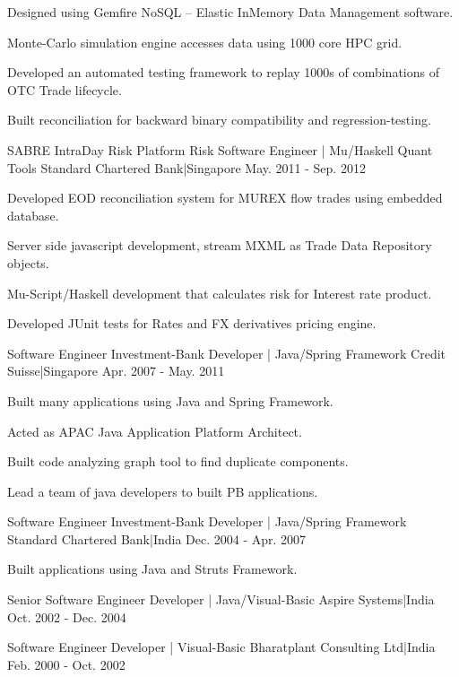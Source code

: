 \begin{cventries}
{\begin{cvitems}
        \item {Designed using Gemfire NoSQL – Elastic InMemory Data Management software.}
        \item {Monte-Carlo simulation engine accesses data using 1000 core HPC grid.}
        \item {Developed an automated testing framework to replay 1000s of combinations of OTC Trade lifecycle.}
        \item {Built reconciliation for backward binary compatibility and regression-testing.}
      \end{cvitems}
    }
  \cventry
    {SABRE IntraDay Risk Platform}
    {Risk Software Engineer | Mu/Haskell Quant Tools}
    {Standard Chartered Bank|Singapore}
    {May. 2011 - Sep. 2012}
    {
      \begin{cvitems}
        \item {Developed EOD reconciliation system for MUREX flow trades using embedded database.}
        \item {Server side javascript development, stream MXML as Trade Data Repository objects.}
        \item {Mu-Script/Haskell development that calculates risk for Interest rate product.}
        \item {Developed JUnit tests for Rates and FX derivatives pricing engine.}
      \end{cvitems}
    }
  \cventry
    {Software Engineer}
    {Investment-Bank Developer | Java/Spring Framework}
    {Credit Suisse|Singapore}
    {Apr. 2007 - May. 2011}
    {
      \begin{cvitems}
        \item {Built many applications using Java and Spring Framework.}
        \item {Acted as APAC Java Application Platform Architect.}
        \item {Built code analyzing graph tool to find duplicate components.}
        \item {Lead a team of java developers to built PB applications.}
      \end{cvitems}
    }
  \cventry
    {Software Engineer}
    {Investment-Bank Developer | Java/Spring Framework}
    {Standard Chartered Bank|India}
    {Dec. 2004 - Apr. 2007}
    {
      \begin{cvitems}
        \item {Built applications using Java and Struts Framework.}
      \end{cvitems}
    }
  \cventry
    {Senior Software Engineer}
    {Developer | Java/Visual-Basic}
    {Aspire Systems|India}
    {Oct. 2002 - Dec. 2004}
    {
      \begin{cvitems}
      \end{cvitems}
    }
  \cventry
    {Software Engineer}
    {Developer | Visual-Basic}
    {Bharatplant Consulting Ltd|India}
    {Feb. 2000 - Oct. 2002}
    {
      \begin{cvitems}
      \end{cvitems}
    }
\end{cventries}
